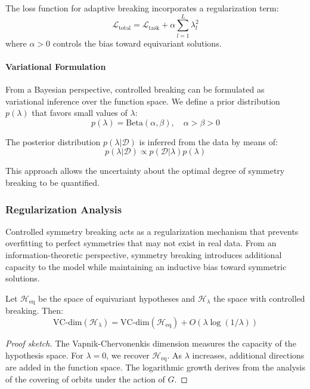 The loss function for adaptive breaking incorporates a regularization term:
\begin{equation}
\mathcal{L}_{\text{total}} = \mathcal{L}_{\text{task}} + \alpha \sum_{l=1}^L \lambda_l^2
\end{equation}
where $\alpha > 0$ controls the bias toward equivariant solutions.

\paragraph{Variational Formulation}

From a Bayesian perspective, controlled breaking can be formulated as variational inference over the function space. We define a prior distribution $p(\lambda)$ that favors small values of $\lambda$:
\begin{equation}
p(\lambda) = \text{Beta}(\alpha, \beta), \quad \alpha > \beta > 0
\end{equation}

The posterior distribution $p(\lambda | \mathcal{D})$ is inferred from the data by means of:
\begin{equation}
p(\lambda | \mathcal{D}) \propto p(\mathcal{D} | \lambda) p(\lambda)
\end{equation}

This approach allows the uncertainty about the optimal degree of symmetry breaking to be quantified.

\subsubsection{Regularization Analysis}

Controlled symmetry breaking acts as a regularization mechanism that prevents overfitting to perfect symmetries that may not exist in real data. From an information-theoretic perspective, symmetry breaking introduces additional capacity to the model while maintaining an inductive bias toward symmetric solutions.

\begin{theorem}
Let $\mathcal{H}_{\text{eq}}$ be the space of equivariant hypotheses and $\mathcal{H}_{\lambda}$ the space with controlled breaking. Then:
\[\text{VC-dim}(\mathcal{H}_{\lambda}) = \text{VC-dim}(\mathcal{H}_{\text{eq}}) + O(\lambda \log(1/\lambda))\]
\end{theorem}

\begin{proof}[Proof sketch]
The Vapnik-Chervonenkis dimension measures the capacity of the hypothesis space. For $\lambda = 0$, we recover $\mathcal{H}_{\text{eq}}$. As $\lambda$ increases, additional directions are added in the function space. The logarithmic growth derives from the analysis of the covering of orbits under the action of $G$.
\end{proof}

